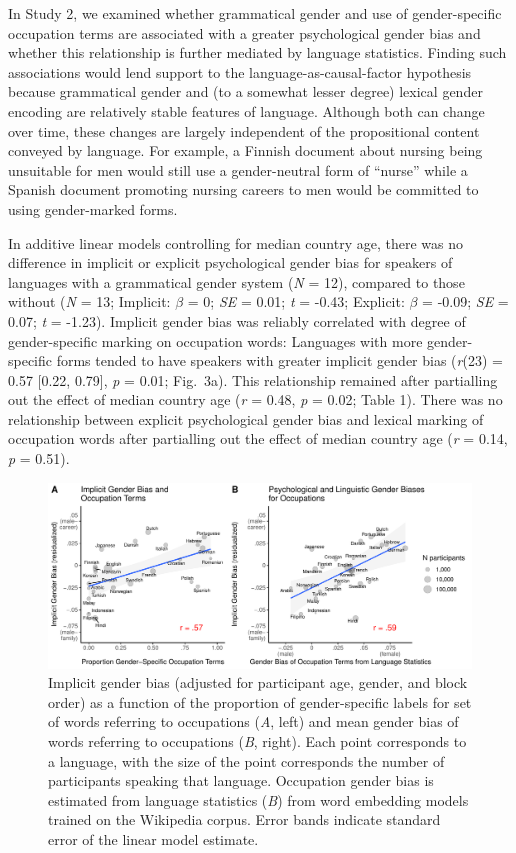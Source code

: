 \documentclass[9pt,twocolumn,twoside,lineno]{pnas-new}
\begin{document}
In Study 2, we examined whether grammatical gender and use of
gender-specific occupation terms are associated with a greater
psychological gender bias and whether this relationship is further
mediated by language statistics. Finding such associations would lend support to the language-as-causal-factor hypothesis because grammatical gender and (to a somewhat lesser degree) lexical gender encoding are relatively stable features of language. Although both can change over time, these changes are largely independent of the propositional content conveyed by language. For example, a Finnish document about nursing being unsuitable for men would still use a gender-neutral form of
\enquote{nurse} while a Spanish document promoting nursing careers to
men would be committed to using gender-marked forms.


In additive linear models controlling for median country age, there was
no difference in implicit or explicit psychological gender bias for
speakers of languages with a grammatical gender system (\emph{N} = 12),
compared to those without (\emph{N} = 13; Implicit: \(\beta\) = 0;
\emph{SE} = 0.01; \emph{t} = -0.43; Explicit: \(\beta\) = -0.09;
\emph{SE} = 0.07; \emph{t} = -1.23).  Implicit gender
bias was reliably correlated with degree of gender-specific marking on
occupation words: Languages with more gender-specific forms tended to
have speakers with greater implicit gender bias (\emph{r}(23) = 0.57 {[}0.22, 0.79{]}, \emph{p} = 0.01; Fig.\ 3a). This relationship remained after partialling out the effect of
median country age (\emph{r} = 0.48, \emph{p} = 0.02; Table 1). There
was no relationship between explicit psychological gender bias and
lexical marking of occupation words after partialling out the effect of
median country age (\emph{r} = 0.14, \emph{p} = 0.51).

\begin{figure}[t!]
\centering
\includegraphics[width=17cm]{pnas_rmd/iat_lang_pnas_files/figure-latex/study2_fig.pdf}
\caption{\label{fig:unnamed-chunk-15}Implicit gender bias (adjusted for participant age,
gender, and block order) as a function of the proportion of gender-specific labels for set of words referring to occupations ({\it A}, left) and  mean gender bias of words
referring to occupations ({\it B}, right). Each point corresponds to a language, with the size of the point corresponds the number of participants
speaking that language. Occupation gender bias is estimated from language statistics ({\it B}) from word embedding models trained on the
Wikipedia  corpus. Error bands indicate standard error of the
linear model estimate.}
\end{figure}
\end{document}

